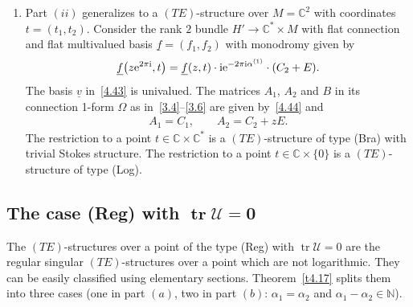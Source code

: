 \documentclass[10pt,a4paper]{amsart}
\numberwithin{equation}{section}
\numberwithin{figure}{section}
\newcommand{\N}{{\mathbb N}}
\newcommand{\C}{{\mathbb C}}
\newcommand{\UU}{{\mathcal U}}
\newcommand{\uuuu}{\underline}
\DeclareMathOperator{\tr}{tr}
\begin{document}
\begin{Remarks}
\begin{enumerate}
\item[$(iii)$] Part $(ii)$ generalizes to a $(TE)$-structure over
$M=\C^2$ with coordinates $t=(t_1,t_2)$.
Consider the rank $2$ bundle $H'\to\C^*\times M$ with
flat connection and flat multivalued basis $\uuuu{f}=(f_1,f_2)$
with monodromy given by
\begin{gather*}%
\uuuu{f}\big(z{\rm e}^{2\pi {\rm i}},t\big)=\uuuu{f}(z,t)\cdot {\rm i}{\rm e}^{-2\pi {\rm i}\alpha^{(1)}}
\cdot (C_2+E).
\end{gather*}
The basis $\uuuu{v}$ in~\eqref{4.43} is univalued.
The matrices $A_1$, $A_2$ and $B$ in its connection 1-form
$\Omega$ as in~\eqref{3.4}--\eqref{3.6} are given
by~\eqref{4.44} and
\begin{gather*}%
A_1=C_1,\qquad
A_2=C_2+zE.
\end{gather*}
The restriction to a point $t\in \C\times\C^*$ is a
$(TE)$-structure of type (Bra) with trivial Stokes
structure.
The restriction to a point $t\in\C\times\{0\}$
is a $(TE)$-structure of type (Log).
\end{enumerate}
\end{Remarks}



\subsection[The case (Reg) with $\tr\UU=0$]
{The case (Reg) with $\boldsymbol{\tr\UU=0}$}\label{c4.5}

The $(TE)$-structures over a point of the type (Reg) with
$\tr\UU=0$ are the regular singular $(TE)$-structures
over a point which are not logarithmic.
They can be easily classified using elementary sections.
Theorem~\ref{t4.17} splits them into three cases
(one in part $(a)$, two in part $(b)$: $\alpha_1=\alpha_2$
and $\alpha_1-\alpha_2\in\N$).
\end{document}
